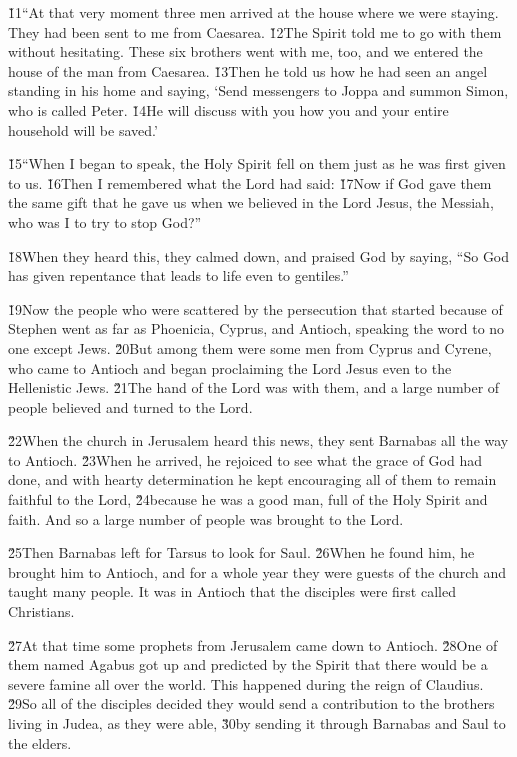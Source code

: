 \v{11}``At that very moment three men arrived at the house where we were staying. They had been sent to me from Caesarea. \v{12}The Spirit told me to go with them without hesitating. These six brothers went with me, too, and we entered the house of the man from Caesarea. \v{13}Then he told us how he had seen an angel standing in his home and saying, `Send messengers to Joppa and summon Simon, who is called Peter. \v{14}He will discuss with you how you and your entire household will be saved.'

\v{15}``When I began to speak, the Holy Spirit fell on them just as he was first given to us. \v{16}Then I remembered what the Lord had said:  \v{17}Now if God gave them the same gift that he gave us when we believed in the Lord Jesus, the Messiah, who was I to try to stop God?''

\v{18}When they heard this, they calmed down, and praised God by saying, ``So God has given repentance that leads to life even to gentiles.''

\v{19}Now the people who were scattered by the persecution that started because of Stephen went as far as Phoenicia, Cyprus, and Antioch, speaking the word to no one except Jews. \v{20}But among them were some men from Cyprus and Cyrene, who came to Antioch and began proclaiming the Lord Jesus even to the Hellenistic Jews. \v{21}The hand of the Lord was with them, and a large number of people believed and turned to the Lord.

\v{22}When the church in Jerusalem heard this news, they sent Barnabas all the way to Antioch. \v{23}When he arrived, he rejoiced to see what the grace of God had done, and with hearty determination he kept encouraging all of them to remain faithful to the Lord, \v{24}because he was a good man, full of the Holy Spirit and faith. And so a large number of people was brought to the Lord.

\v{25}Then Barnabas left for Tarsus to look for Saul. \v{26}When he found him, he brought him to Antioch, and for a whole year they were guests of the church and taught many people. It was in Antioch that the disciples were first called Christians.

\v{27}At that time some prophets from Jerusalem came down to Antioch. \v{28}One of them named Agabus got up and predicted by the Spirit that there would be a severe famine all over the world. This happened during the reign of Claudius. \v{29}So all of the disciples decided they would send a contribution to the brothers living in Judea, as they were able, \v{30}by sending it through Barnabas and Saul to the elders.

